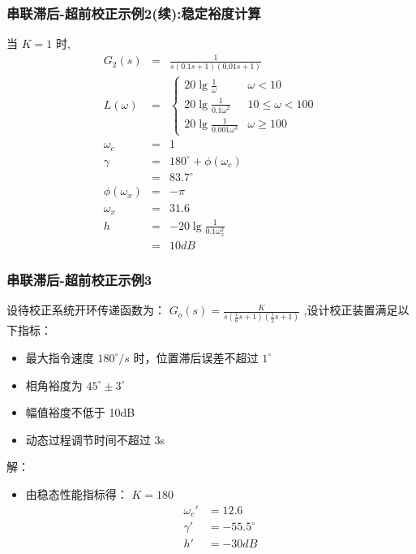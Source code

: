 \documentclass[table]{beamer}
\begin{document}
\begin{frame}
\frametitle{串联滞后-超前校正示例2(续):稳定裕度计算}
\label{sec-4-2-6}

当  $K=1$  时, 
\begin{eqnarray*}
G_2(s) &=& \frac{1}{s(0.1s+1)(0.01s+1)} \\
L(\omega) & = & \begin{cases} 20\lg\frac{1}{\omega} & \omega<10 \\
                              20\lg\frac{1}{0.1\omega^2} & 10\leq \omega <100 \\
                              20\lg\frac{1}{0.001\omega^3} & \omega\geq 100  \end{cases}\\
\omega_c &=& 1 \\
\gamma &=& 180^{\circ}+\phi(\omega_c) \\
 &=& 83.7^{\circ} \\
\phi(\omega_x) &=& -\pi \\
\omega_x &=& 31.6\\
h &=& -20\lg\frac{1}{0.1\omega_x^2} \\
 &=& 10 dB
\end{eqnarray*}
\end{frame}
\begin{frame}
\frametitle{串联滞后-超前校正示例3}
\label{sec-4-2-7}

设待校正系统开环传递函数为： $G_o(s)=\frac{K}{s(\frac{1}{6}s+1)(\frac{1}{2}s+1)}$ ,设计校正装置满足以下指标：
\begin{itemize}
\item 最大指令速度 $180^{\circ}/s$ 时，位置滞后误差不超过 $1^{\circ}$
\item 相角裕度为 $45^{\circ}\pm 3^{\circ}$
\item 幅值裕度不低于 10dB
\item 动态过程调节时间不超过 3s
\end{itemize}

解：
\begin{itemize}
\item <2-> 由稳态性能指标得：  $K=180$
       \begin{align*}
        \omega_c' &=12.6 \\
        \gamma' &= -55.5^{\circ}\\
        h' &=-30dB
       \end{align*}
\end{itemize}
\end{frame}
\end{document}

